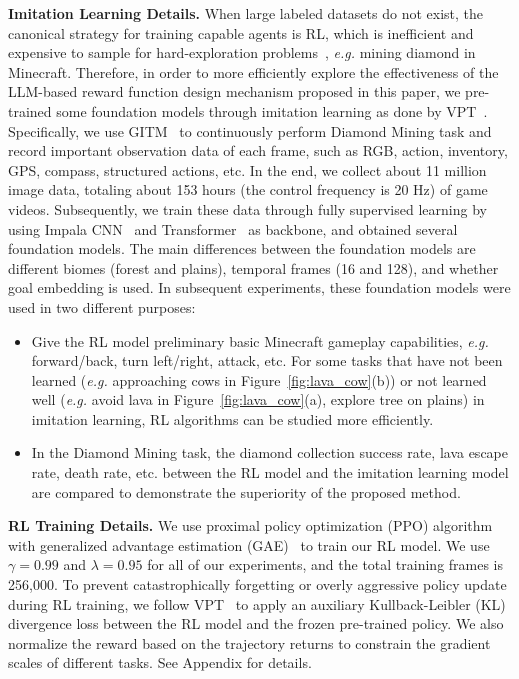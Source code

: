 \noindent\textbf{Imitation Learning Details.}\label{sec:il}
When large labeled datasets do not exist, the canonical strategy for training capable agents is RL, which is inefficient and expensive to sample for hard-exploration problems~\cite{berner2019dota,jaderberg2019human,baker2022video}, 
\emph{e.g.} mining diamond in Minecraft. Therefore, in order to more efficiently explore the effectiveness of the LLM-based reward function design mechanism proposed in this paper, we pre-trained some foundation models through imitation learning as done by VPT~\cite{baker2022video}. Specifically, we use GITM~\cite{zhu2023ghost} to continuously perform Diamond Mining task and record important observation data of each frame, such as RGB, action, inventory, GPS, compass, structured actions, etc. In the end, we collect about 11 million image data, totaling about 153 hours (the control frequency is 20 Hz) of game videos. Subsequently, we train these data through fully supervised learning by using Impala CNN~\cite{espeholt2018impala} and Transformer~\cite{vaswani2017attention} as backbone, and obtained several foundation models. The main differences between the foundation models are different biomes (forest and plains), temporal frames (16 and 128), and whether goal embedding is used. 
In subsequent experiments, these foundation models were used in two different purposes:
\begin{itemize}
    \item Give the RL model preliminary basic Minecraft gameplay capabilities, \emph{e.g.} forward/back, turn left/right, attack, etc. For some tasks that have not been learned (\emph{e.g.} approaching cows in Figure~\ref{fig:lava_cow}(b)) or not learned well (\emph{e.g.} avoid lava in Figure~\ref{fig:lava_cow}(a), explore tree on plains) in imitation learning, 
    RL algorithms can be studied more efficiently. 
    \item In the Diamond Mining task, the diamond collection success rate, lava escape rate, death rate, etc. between the RL model and the imitation learning model are compared to demonstrate the superiority of the proposed method.
\end{itemize}

\noindent\textbf{RL Training Details.}
We use proximal policy optimization (PPO) algorithm~\cite{schulman2017proximal} with generalized advantage estimation (GAE)~\cite{schulman2015high} to train our RL model. We use $\gamma=0.99$ and $\lambda=0.95$ for all of our experiments, and the total training frames is 256,000.
To prevent catastrophically forgetting or overly aggressive policy update during RL training, we follow VPT~\cite{baker2022video} to apply an auxiliary Kullback-Leibler (KL) divergence loss between the RL model and the frozen pre-trained policy. We also normalize the reward based on the trajectory returns to constrain the gradient scales of different tasks. See Appendix for details. 

